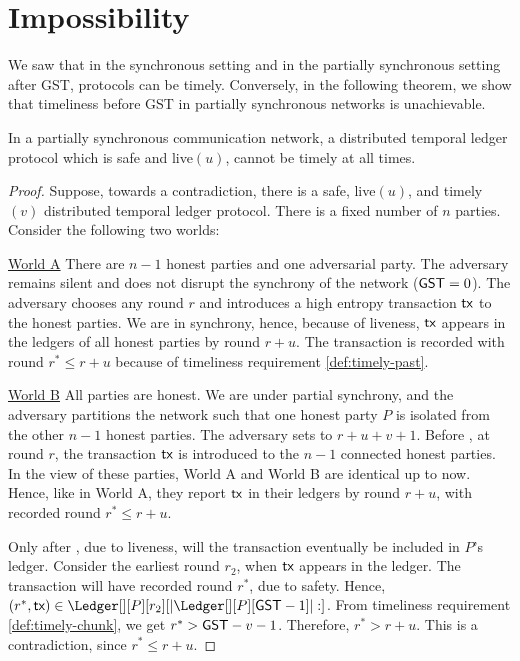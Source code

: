 \section{Impossibility}\label{sec:impossibility}

We saw that in the synchronous setting and in the partially synchronous setting after GST,
protocols can be timely.
Conversely, in the following theorem, we show that timeliness before GST in partially
synchronous networks is unachievable.

\begin{theorem}
  In a partially synchronous communication network, a distributed temporal ledger protocol
  which is safe and live$(u)$, cannot be timely at all times.
\end{theorem}
\begin{proof}
  Suppose, towards a contradiction, there is a safe, live$(u)$, and timely$(v)$ distributed temporal ledger protocol.
  There is a fixed number of $n$ parties.
  Consider the following two worlds:

  \noindent
  \underline{World A}
  There are $n-1$ honest parties and one adversarial party. The adversary remains silent and
  does not disrupt the synchrony of the network ($\textsf{GST} = 0$).
  The adversary chooses any round $r$ and introduces a high entropy transaction $\textsf{tx}$ to the honest parties. We are in
  synchrony, hence, because of liveness, $\textsf{tx}$ appears in the ledgers of all honest parties
  by round $r + u$. The transaction is recorded with round $r^* \leq r + u$ because of
  timeliness requirement \ref{def:timely-past}.

  \noindent
  \underline{World B}
  All parties are honest. We are under partial synchrony, and the adversary partitions the network such that
  one honest party $P$ is isolated from the other $n-1$ honest parties.
  The adversary sets \gst to  $r + u + v + 1$.
  Before \gst, at round $r$, the transaction $\textsf{tx}$ is introduced to the $n-1$ connected
  honest parties. In the view of these parties,
  World A and World B are identical up to now. Hence, like in World A,
  they report $\textsf{tx}$ in their ledgers by round $r + u$, with recorded round $r^* \leq r + u$.

  Only after \gst, due to liveness, will the transaction eventually be included in $P$'s ledger.
  Consider the earliest round $r_2$, when $\textsf{tx}$ appears in the ledger.
  The transaction will have recorded round $r^*$, due to safety.
  Hence, $(r^*, \tx) \in \Ledger[][P][r_2][|\Ledger[][P][\gst - 1]|:]$.
  From timeliness requirement \ref{def:timely-chunk}, we
  get $r^* > \textsf{GST} - v - 1$. Therefore, $r^* > r + u$.
  This is a contradiction, since $r^* \leq r + u$.
  \Qed
\end{proof}
